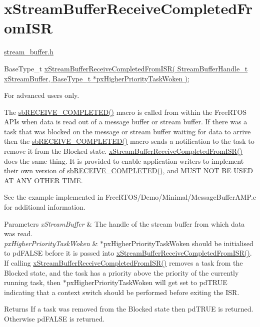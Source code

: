 \hypertarget{group__x_stream_buffer_receive_completed_from_i_s_r}{}\section{x\+Stream\+Buffer\+Receive\+Completed\+From\+I\+SR}
\label{group__x_stream_buffer_receive_completed_from_i_s_r}
\hyperlink{stream__buffer_8h}{stream\+\_\+buffer.\+h}


\begin{DoxyPre}
BaseType\_t \hyperlink{stream__buffer_8h_ac12e93e96e0eafbc0e981d00e7275d32}{xStreamBufferReceiveCompletedFromISR( StreamBufferHandle\_t xStreamBuffer, BaseType\_t *pxHigherPriorityTaskWoken )};
\end{DoxyPre}


For advanced users only.

The \hyperlink{stream__buffer_8c_a4d6a29d283acfa2d4ef576476eedc789}{sb\+R\+E\+C\+E\+I\+V\+E\+\_\+\+C\+O\+M\+P\+L\+E\+T\+E\+D()} macro is called from within the Free\+R\+T\+OS A\+P\+Is when data is read out of a message buffer or stream buffer. If there was a task that was blocked on the message or stream buffer waiting for data to arrive then the \hyperlink{stream__buffer_8c_a4d6a29d283acfa2d4ef576476eedc789}{sb\+R\+E\+C\+E\+I\+V\+E\+\_\+\+C\+O\+M\+P\+L\+E\+T\+E\+D()} macro sends a notification to the task to remove it from the Blocked state. \hyperlink{stream__buffer_8h_ac12e93e96e0eafbc0e981d00e7275d32}{x\+Stream\+Buffer\+Receive\+Completed\+From\+I\+S\+R()} does the same thing. It is provided to enable application writers to implement their own version of \hyperlink{stream__buffer_8c_a4d6a29d283acfa2d4ef576476eedc789}{sb\+R\+E\+C\+E\+I\+V\+E\+\_\+\+C\+O\+M\+P\+L\+E\+T\+E\+D()}, and M\+U\+ST N\+OT BE U\+S\+ED AT A\+NY O\+T\+H\+ER T\+I\+ME.

See the example implemented in Free\+R\+T\+O\+S/\+Demo/\+Minimal/\+Message\+Buffer\+A\+M\+P.\+c for additional information.


\begin{DoxyParams}{Parameters}
{\em x\+Stream\+Buffer} & The handle of the stream buffer from which data was read.\\
\hline
{\em px\+Higher\+Priority\+Task\+Woken} & $\ast$px\+Higher\+Priority\+Task\+Woken should be initialised to pd\+F\+A\+L\+SE before it is passed into \hyperlink{stream__buffer_8h_ac12e93e96e0eafbc0e981d00e7275d32}{x\+Stream\+Buffer\+Receive\+Completed\+From\+I\+S\+R()}. If calling \hyperlink{stream__buffer_8h_ac12e93e96e0eafbc0e981d00e7275d32}{x\+Stream\+Buffer\+Receive\+Completed\+From\+I\+S\+R()} removes a task from the Blocked state, and the task has a priority above the priority of the currently running task, then $\ast$px\+Higher\+Priority\+Task\+Woken will get set to pd\+T\+R\+UE indicating that a context switch should be performed before exiting the I\+SR.\\
\hline
\end{DoxyParams}
\begin{DoxyReturn}{Returns}
If a task was removed from the Blocked state then pd\+T\+R\+UE is returned. Otherwise pd\+F\+A\+L\+SE is returned. 
\end{DoxyReturn}
